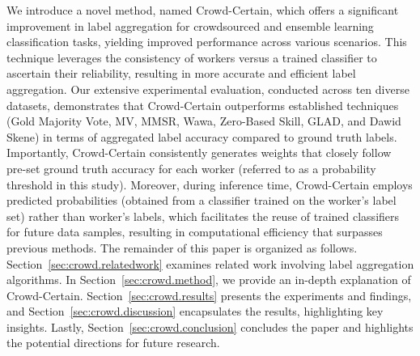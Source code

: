 \documentclass[default]{bst/sn-jnl_mine}%
\begin{document}
We introduce a novel method, named Crowd-Certain, which offers a significant improvement  in label aggregation for crowdsourced and ensemble learning classification tasks, yielding improved performance across various scenarios. This technique leverages the consistency of workers versus a trained classifier to ascertain their reliability, resulting in more accurate and efficient label aggregation.
Our extensive experimental evaluation, conducted across ten diverse datasets, demonstrates that Crowd-Certain outperforms established techniques (Gold Majority Vote, MV, MMSR, Wawa, Zero-Based Skill, GLAD, and Dawid Skene) in terms of aggregated label accuracy compared to ground truth labels. Importantly, Crowd-Certain consistently generates weights that closely follow pre-set ground truth accuracy for each worker (referred to as a probability threshold in this study). Moreover, during inference time, Crowd-Certain employs predicted probabilities (obtained from a classifier trained on the worker's label set) rather than worker's labels, which facilitates the reuse of trained classifiers for future data samples, resulting in computational efficiency that surpasses previous methods.
The remainder of this paper is organized as follows. Section~\ref{sec:crowd.relatedwork} examines related work involving label aggregation algorithms. In Section~\ref{sec:crowd.method}, we provide an in-depth explanation of Crowd-Certain. Section~\ref{sec:crowd.results} presents the experiments and findings, and Section~\ref{sec:crowd.discussion} encapsulates the results, highlighting key insights. Lastly, Section~\ref{sec:crowd.conclusion} concludes the paper and highlights the potential directions for future research.
\end{document}
